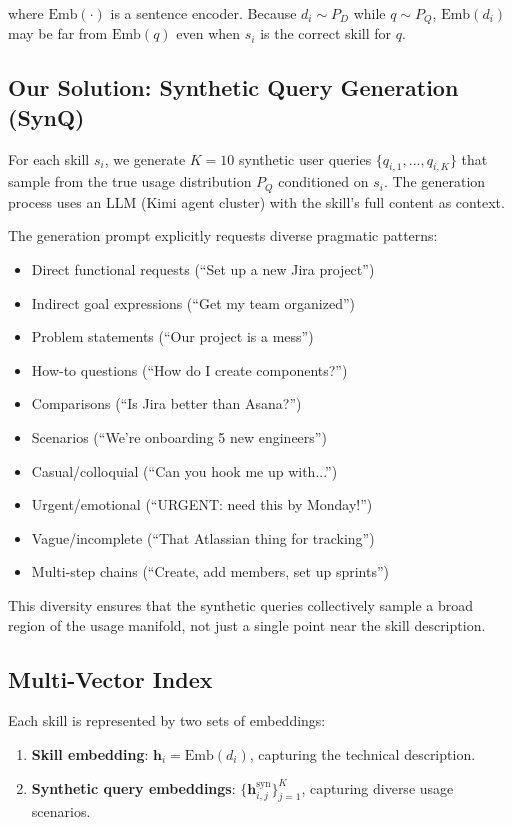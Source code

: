 \documentclass[11pt,a4paper]{article}
\begin{document}
where $\text{Emb}(\cdot)$ is a sentence encoder. Because $d_i \sim P_D$ while $q \sim P_Q$, $\text{Emb}(d_i)$ may be far from $\text{Emb}(q)$ even when $s_i$ is the correct skill for $q$.

\subsection{Our Solution: Synthetic Query Generation (SynQ)}

For each skill $s_i$, we generate $K=10$ synthetic user queries $\{q_{i,1}, ..., q_{i,K}\}$ that sample from the true usage distribution $P_Q$ conditioned on $s_i$. The generation process uses an LLM (Kimi agent cluster) with the skill's full content as context.

The generation prompt explicitly requests diverse pragmatic patterns:
\begin{itemize}
  \item Direct functional requests (``Set up a new Jira project'')
  \item Indirect goal expressions (``Get my team organized'')
  \item Problem statements (``Our project is a mess'')
  \item How-to questions (``How do I create components?'')
  \item Comparisons (``Is Jira better than Asana?'')
  \item Scenarios (``We're onboarding 5 new engineers'')
  \item Casual/colloquial (``Can you hook me up with...'')
  \item Urgent/emotional (``URGENT: need this by Monday!'')
  \item Vague/incomplete (``That Atlassian thing for tracking'')
  \item Multi-step chains (``Create, add members, set up sprints'')
\end{itemize}

This diversity ensures that the synthetic queries collectively sample a broad region of the usage manifold, not just a single point near the skill description.

\subsection{Multi-Vector Index}

Each skill is represented by two sets of embeddings:
\begin{enumerate}
  \item \textbf{Skill embedding}: $\mathbf{h}_i = \text{Emb}(d_i)$, capturing the technical description.
  \item \textbf{Synthetic query embeddings}: $\{\mathbf{h}_{i,j}^{\text{syn}}\}_{j=1}^{K}$, capturing diverse usage scenarios.
\end{enumerate}
\end{document}
